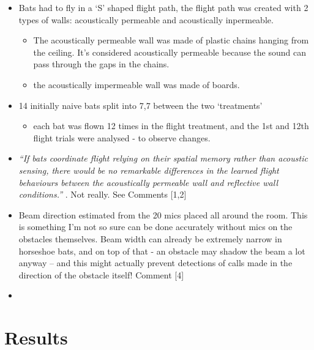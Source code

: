 \documentclass[
]{book}
\providecommand{\tightlist}{%
  \setlength{\itemsep}{0pt}\setlength{\parskip}{0pt}}
\begin{document}
\begin{itemize}
\item
  Bats had to fly in a `S' shaped flight path, the flight path was created with 2 types of walls: acoustically permeable and acoustically inpermeable.

  \begin{itemize}
  \tightlist
  \item
    The acoustically permeable wall was made of plastic chains hanging from the ceiling. It's considered acoustically permeable because the sound can pass through the gaps in the chains.
  \item
    the acoustically impermeable wall was made of boards.
  \end{itemize}
\item
  14 initially naive bats split into 7,7 between the two `treatments'

  \begin{itemize}
  \tightlist
  \item
    each bat was flown 12 times in the flight treatment, and the 1st and 12th flight trials were analysed - to observe changes.
  \end{itemize}
\item
  \emph{``If bats coordinate flight relying on their spatial memory rather than acoustic sensing, there would be no remarkable differences in the learned flight behaviours between the acoustically permeable wall and reflective wall conditions.''} . Not really. See Comments {[}1,2{]}
\item
  Beam direction estimated from the 20 mics placed all around the room. This is something I'm not so sure can be done accurately without mics on the obstacles themselves. Beam width can already be extremely narrow in horseshoe bats, and on top of that - an obstacle may shadow the beam a lot anyway -- and this might actually prevent detections of calls made in the direction of the obstacle itself! Comment {[}4{]}
\item
\end{itemize}

\hypertarget{results-12}{%
\section{Results}\label{results-12}}
\end{document}
